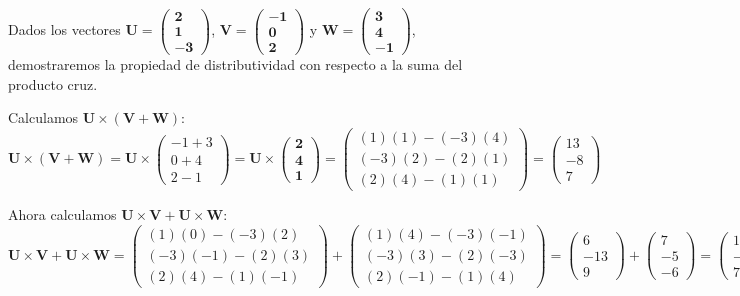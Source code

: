 \begin{example}
Dados los vectores $\mathbf{U} = \begin{pmatrix} \boldsymbol{2} \\ \boldsymbol{1} \\ \boldsymbol{-3} \end{pmatrix}$, $\mathbf{V} = \begin{pmatrix} \boldsymbol{-1} \\ \boldsymbol{0} \\ \boldsymbol{2} \end{pmatrix}$ y $\mathbf{W} = \begin{pmatrix} \boldsymbol{3} \\ \boldsymbol{4} \\ \boldsymbol{-1} \end{pmatrix}$, demostraremos la propiedad de distributividad con respecto a la suma del producto cruz.

Calculamos $\mathbf{U} \times (\mathbf{V} + \mathbf{W})$:
\[
\mathbf{U} \times (\mathbf{V} + \mathbf{W}) = \mathbf{U} \times \begin{pmatrix} -1+3 \\ 0+4 \\ 2-1 \end{pmatrix} = \mathbf{U} \times \begin{pmatrix} \boldsymbol{2} \\ \boldsymbol{4} \\ \boldsymbol{1} \end{pmatrix} = \begin{pmatrix} (1)(1) - (-3)(4) \\ (-3)(2) - (2)(1) \\ (2)(4) - (1)(1) \end{pmatrix} = \begin{pmatrix} 13 \\ -8 \\ 7 \end{pmatrix}
\]

Ahora calculamos $\mathbf{U} \times \mathbf{V} + \mathbf{U} \times \mathbf{W}$:
\[
\mathbf{U} \times \mathbf{V} + \mathbf{U} \times \mathbf{W} = \begin{pmatrix} (1)(0) - (-3)(2) \\ (-3)(-1) - (2)(3) \\ (2)(4) - (1)(-1) \end{pmatrix} + \begin{pmatrix} (1)(4) - (-3)(-1) \\ (-3)(3) - (2)(-3) \\ (2)(-1) - (1)(4) \end{pmatrix} = \begin{pmatrix} 6 \\ -13 \\ 9 \end{pmatrix} + \begin{pmatrix} 7 \\ -5 \\ -6 \end{pmatrix} = \begin{pmatrix} 13 \\ -8 \\ 7 \end{pmatrix}\]
\end{example}
